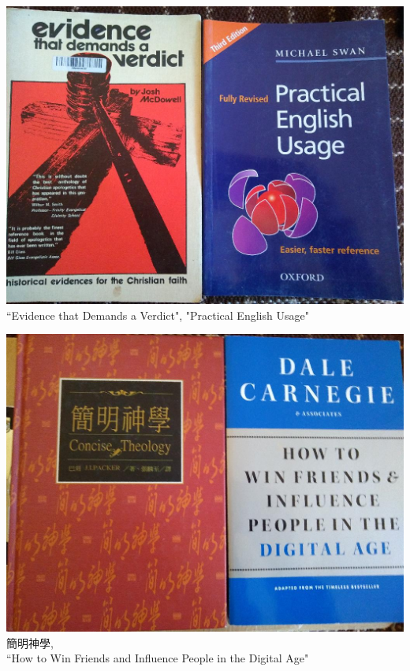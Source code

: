 \documentclass[t]{beamer}
\newcommand{\htarget}[2]{\hypertarget{#1}{#2}}
\begin{document}
\begin{frame}\htarget{evidence}{} \begin{center}
\includegraphics[height=0.8\textheight]{book04_mini.jpg} \\
``Evidence that Demands a Verdict", "Practical English Usage"
\end{center} \end{frame}
\begin{frame}\htarget{win}{} \begin{center}
\includegraphics[height=0.8\textheight]{book05_mini.jpg} \\
簡明神學, \\``How to Win Friends and Influence People in the Digital Age"
\end{center} \end{frame}
\end{document}
